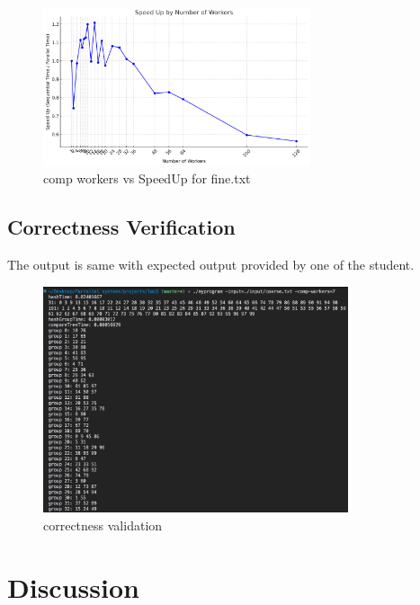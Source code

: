 \documentclass[letterpaper,12pt]{article}
\theoremstyle{remark}
\begin{document}
\begin{figure}[ht]
    \centering
    \includegraphics[width=0.7\textwidth]{compworkerSpeedUpfine.png}
    \caption{comp workers vs SpeedUp for fine.txt}
    \label{fig:Hashworkers vs SpeedUp}
\end{figure}



\subsection{Correctness Verification}
The output is same with expected output provided by one of the student.
\begin{figure}[ht]
    \centering
    \includegraphics[width=0.8\textwidth]{correctness.png}
    \caption{correctness validation}
    \label{fig:Hashworkers vs SpeedUp}
\end{figure}




\clearpage


\section{Discussion}
\end{document}
